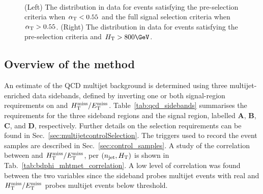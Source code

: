 \begin{figure}[!h]
 \centering
  \\
 \caption{(Left) The \alphat distribution in data for events
   satisfying the pre-selection criteria when $\alpha_{\text{T}} < 0.55$ and the
   full signal selection criteria when $\alpha_{\text{T}} > 0.55$. (Right) The
   \bdphi distribution in data for events satisfying the pre-selection
   criteria and $\scalht > 800\GeV$. }%
 \label{fig:alphat_bdphi_distr}
\end{figure}

\subsection{Overview of the method}
\label{sec:qcdMethod}

An estimate of the QCD multijet background is determined using three
multijet-enriched data sidebands, defined by inverting one or both
signal-region requirements on \bdphi and
$\mbox{$H_{\rm T}^{\rm miss}$}/\mbox{$E_\text{T}^{\rm miss}$}$. Table~\ref{tab:qcd_sidebands} summarises the requirements
for the three sideband regions and the signal region, labelled
\textbf{A}, \textbf{B}, \textbf{C}, and \textbf{D},
respectively. Further details on the selection requirements can be
found in Sec.~\ref{sec:multijetcontrolSelection}. The triggers used to
record the event samples are described in
Sec.~\ref{sec:control_samples}. A study of the correlation between
\bdphi and $\mbox{$H_{\rm T}^{\rm miss}$}/\mbox{$E_\text{T}^{\rm miss}$}$, per $(n_{\text{jet}}, \mbox{$H_\text{T}$})$ is shown in Tab.~\ref{tab:bdphi_mhtmet_correlation}. A low level of correlation was found between the two variables since
the \bdphi sideband probes multijet events with real \met and $\mbox{$H_{\rm T}^{\rm miss}$}/\mbox{$E_\text{T}^{\rm miss}$}$
probes multijet events below threshold.

